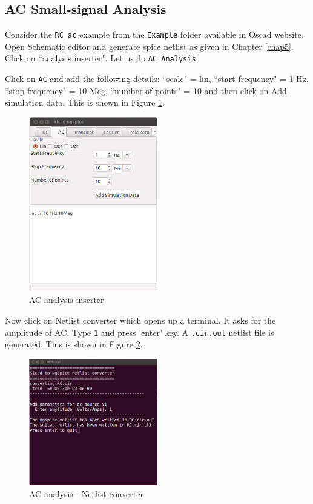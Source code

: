 \subsection{AC Small-signal Analysis}
Consider the {\tt RC\_ac} example from the {\tt Example} folder available in Oscad website. Open Schematic editor and generate spice netlist as given in Chapter \ref{chap5}. Click on ``analysis inserter". Let us do {\tt AC Analysis}.

Click on {\tt AC} and add the following details: ``scale" = lin, ``start frequency" = 1 Hz, ``stop frequency" = 10 Meg, ``number of points" = 10 and then click on Add simulation data. This is shown in Figure \ref{15}.
\begin{figure}[t]
\centering
\includegraphics[width=0.5\textwidth]{figures/5}
\caption{AC analysis inserter}
\label{15}
\end{figure}
Now click on Netlist converter which opens up a terminal. It asks for the amplitude of AC. Type {\tt 1} and press 'enter' key. A {\tt .cir.out} netlist file is generated.   This is shown in Figure \ref{16}.
\begin{figure}[t]
\centering
\includegraphics[width=0.5\textwidth]{figures/16}
\caption{AC analysis - Netlist converter}
\label{16}
\end{figure}
